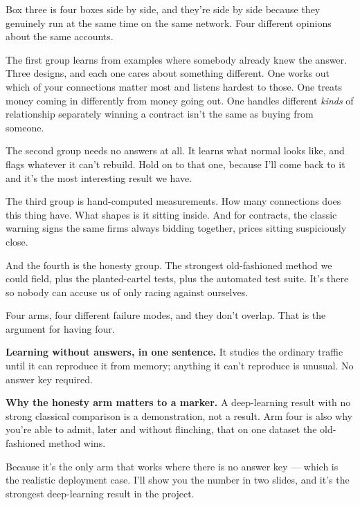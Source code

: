 \documentclass[11pt]{article}
\begin{document}
\begin{saythis}
Box three is four boxes side by side, and they're side by side because they
genuinely run at the same time on the same network. Four different opinions
about the same accounts.

The first group learns from examples where somebody already knew the answer.
Three designs, and each one cares about something different. One works
out which of your connections matter most and listens hardest to those. One
treats money coming in differently from money going out. One handles different
\emph{kinds} of relationship separately \bt winning a contract isn't the same
as buying from someone.

The second group needs no answers at all. It learns what normal looks like, and
flags whatever it can't rebuild. Hold on to that one, because I'll come back to
it and it's the most interesting result we have.

The third group is hand-computed measurements. How many connections does this
thing have. What shapes is it sitting inside. And for contracts, the classic
warning signs \bt the same firms always bidding together, prices sitting
suspiciously close.

And the fourth is the honesty group. The strongest old-fashioned method we
could field, plus the planted-cartel tests, plus the automated test suite. It's
there so nobody can accuse us of only racing against ourselves.
\end{saythis}

\begin{means}
Four arms, four different failure modes, and they don't overlap. That is the
argument for having four.

\textbf{Learning without answers, in one sentence.} It studies the ordinary
traffic until it can reproduce it from memory; anything it can't reproduce is
unusual. No answer key required.

\textbf{Why the honesty arm matters to a marker.} A deep-learning result with
no strong classical comparison is a demonstration, not a result. Arm four is
also why you're able to admit, later and without flinching, that on one dataset
the old-fashioned method wins.
\end{means}

\begin{asked}
 Because it's the only arm
that works where there is no answer key --- which is the realistic deployment
case. I'll show you the number in two slides, and it's the strongest
deep-learning result in the project.
\end{asked}
\end{document}
